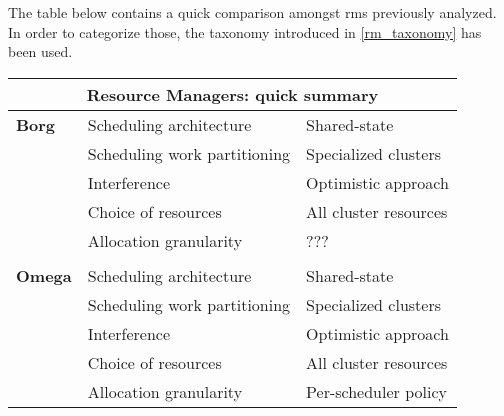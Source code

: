The table below contains a quick comparison amongst \glspl{rm} previously analyzed.
In order to categorize those, the taxonomy introduced in \autoref{rm_taxonomy} has been used.

\begin{table}[h]
\begin{center}
\begin{tabular}{lll}

\multicolumn{3}{c}{\textbf{Resource Managers: quick summary}} \\ \hline
\multicolumn{1}{l|}{\textbf{Borg \cite{borg}}} 
                                   & Scheduling architecture      & Shared-state            \\ \cline{2-3} 
\multicolumn{1}{l|}{}              & Scheduling work partitioning & Specialized clusters    \\ \cline{2-3} 
\multicolumn{1}{l|}{}              & Interference                 & Optimistic approach     \\ \cline{2-3} 
\multicolumn{1}{l|}{}              & Choice of resources          & All cluster resources   \\ \cline{2-3}  
\multicolumn{1}{l|}{}              & Allocation granularity       & ???                     \\ \cline{2-3}

\multicolumn{3}{c}{} \\ \hline
\multicolumn{1}{l|}{\textbf{Omega \cite{omega}}} 
                                   & Scheduling architecture      & Shared-state            \\ \cline{2-3} 
\multicolumn{1}{l|}{}              & Scheduling work partitioning & Specialized clusters    \\ \cline{2-3} 
\multicolumn{1}{l|}{}              & Interference                 & Optimistic approach     \\ \cline{2-3} 
\multicolumn{1}{l|}{}              & Choice of resources          & All cluster resources   \\ \cline{2-3} 
\multicolumn{1}{l|}{}              & Allocation granularity       & Per-scheduler policy    \\ \cline{2-3} 


\end{tabular}
\end{center}
\end{table}
